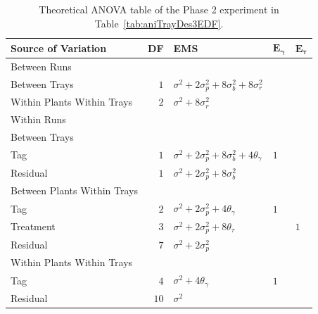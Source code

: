 \begin{table}[!ht]
\centering
 \caption{Theoretical ANOVA table of the Phase 2 experiment in Table~\ref{tab:aniTrayDes3EDF}.}
 \begin{tabular}[t]{lrlll} 
 \toprule 
 \multicolumn{1}{l}{\textbf{Source of Variation}} & \multicolumn{1}{l}{\textbf{DF}} & \multicolumn{1}{l}{\textbf{EMS}}& \multicolumn{1}{l}{$\bm{E_{\gamma}}$}&\multicolumn{1}{l}{$\bm{E_{\tau}}$}\\ 
 \midrule 
 Between Runs &  &  & & \\ 
 \quad Between Trays & $1$ & $\sigma^2+2\sigma_{p}^2+8\sigma_{b}^2+8\sigma_{r}^2$ & & \\  
 \quad Within Plants Within Trays & $2$ & $\sigma^2+8\sigma_{r}^2$ & & \\ \hline 
 Within Runs &  &  & & \\ 
 \quad Between Trays &  &  & & \\ 
 \quad \quad Tag & $1$ & $\sigma^2+2\sigma_{p}^2+8\sigma_{b}^2+4\theta_{\gamma}$ &$1$ & \\ 
 \quad \quad Residual & $1$ & $\sigma^2+2\sigma_{p}^2+8\sigma_{b}^2$ & & \\ \hline 
 \quad Between Plants Within Trays &  &  & & \\ 
 \quad \quad Tag & $2$ & $\sigma^2+2\sigma_{p}^2+4\theta_{\gamma}$ &$1$ & \\ 
 \quad \quad Treatment & $3$ & $\sigma^2+2\sigma_{p}^2+8\theta_{\tau}$ & & $1$\\ 
 \quad \quad Residual & $7$ & $\sigma^2+2\sigma_{p}^2$ & & \\ \hline 
 \quad Within Plants Within Trays &  &  & & \\ 
 \quad \quad Tag & $4$ & $\sigma^2+4\theta_{\gamma}$ &$1$ & \\ 
 \quad \quad Residual & $10$ & $\sigma^2$ & & \\ 
 \bottomrule 
 \end{tabular} 
 \label{tab:ANOVAPhase1RCBD3} 


\end{table}

